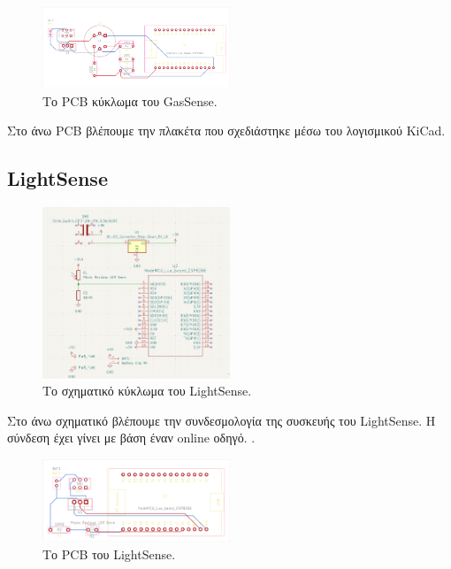 \documentclass[conference]{IEEEtran}
\begin{document}
\begin{figure}[H]
	\colorbox{PineGreen}{\centerline{\includegraphics[width=0.5\textwidth]{assets/GasSense-brd}}}
	\caption{Το PCB κύκλωμα του GasSense.}
	\label{Το PCB κύκλωμα του GasSense.}
\end{figure}

Στο άνω PCB βλέπουμε την πλακέτα που σχεδιάστηκε μέσω του λογισμικού KiCad.

\subsection{LightSense}

\begin{figure}[H]
	\centerline{\includegraphics[width=0.5\textwidth]{assets/lightsense-schematic}}
	\caption{Το σχηματικό κύκλωμα του LightSense.}
	\label{Το σχηματικό κύκλωμα του LightSense.}
\end{figure}

Στο άνω σχηματικό βλέπουμε την συνδεσμολογία της συσκευής του LightSense. Η σύνδεση έχει γίνει με βάση έναν online οδηγό. \cite{ldrconnect}.

\begin{figure}[H]
	\colorbox{PineGreen}{\centerline{\includegraphics[width=0.5\textwidth]{assets/LightSense-brd}}}
	\caption{Το PCB του LightSense.}
	\label{Το PCB του LightSense.}
\end{figure}
\end{document}
